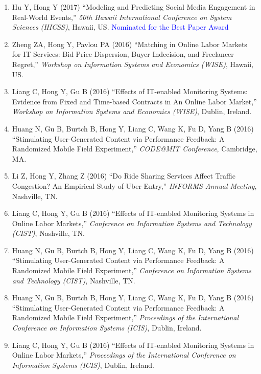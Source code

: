 \documentclass[paper=letter,fontsize=10pt]{scrartcl} %
\newcommand{\ConfEntry}[6]{
		\noindent #1 (#2) ``#3,'' \textit{#4}, #5. \textcolor{blue}{#6}}
\newcommand{\Hong}{Hong Y}
\begin{document}
\begin{enumerate}
\item \ConfEntry{Hu Y, \Hong}{2017}{Modeling and Predicting Social Media Engagement in Real-World Events}{50th Hawaii International Conference on System Sciences (HICSS)}{Hawaii, US}{\protect\newline Nominated for the Best Paper Award}

\item \ConfEntry{Zheng ZA, \Hong, Pavlou PA}{2016}{Matching in Online Labor Markets for IT Services: Bid Price Dispersion, Buyer Indecision, and Freelancer Regret}{Workshop on Information Systems and Economics (WISE)}{Hawaii, US}{}

\item \ConfEntry{Liang C, \Hong, Gu B}{2016}{Effects of IT-enabled Monitoring Systems: Evidence from Fixed and Time-based Contracts in An Online Labor Market}{Workshop on Information Systems and Economics (WISE)}{Dublin, Ireland}{}

\item \ConfEntry{Huang N, Gu B, Burtch B, \Hong, Liang C, Wang K, Fu D, Yang B}{2016}{Stimulating User-Generated Content via Performance Feedback: A Randomized Mobile Field Experiment}{CODE{@}MIT Conference}{Cambridge, MA}{}

\item \ConfEntry{Li Z, \Hong, Zhang Z}{2016}{Do Ride Sharing Services Affect Traffic Congestion? An Empirical Study of Uber Entry}{INFORMS Annual Meeting}{Nashville, TN}{}

\item \ConfEntry{Liang C, \Hong, Gu B}{2016}{Effects of IT-enabled Monitoring Systems in Online Labor Markets}{Conference on Information Systems and Technology (CIST)}{Nashville, TN}{}

\item \ConfEntry{Huang N, Gu B, Burtch B, \Hong, Liang C, Wang K, Fu D, Yang B}{2016}{Stimulating User-Generated Content via Performance Feedback: A Randomized Mobile Field Experiment}{Conference on Information Systems and Technology (CIST)}{Nashville, TN}{}

\item \ConfEntry{Huang N, Gu B, Burtch B, \Hong, Liang C, Wang K, Fu D, Yang B}{2016}{Stimulating User-Generated Content via Performance Feedback: A Randomized Mobile Field Experiment}{Proceedings of the International Conference on Information Systems (ICIS)}{Dublin, Ireland}{}

\item \ConfEntry{Liang C, \Hong, Gu B}{2016}{Effects of IT-enabled Monitoring Systems in Online Labor Markets}{Proceedings of the International Conference on Information Systems (ICIS)}{Dublin, Ireland}{}


\end{enumerate}
\end{document}
